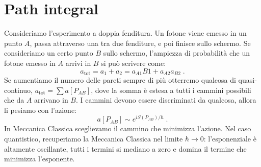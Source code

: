 \documentclass[12pt,a4paper]{article}
\theoremstyle{definition}
\numberwithin{equation}{section}
\begin{document}
\section{Path integral}
Consideriamo l'esperimento a doppia fenditura. Un fotone viene emesso in un punto $A$, passa attraverso una tra due fenditure, e poi finisce sullo schermo. Se consideriamo un certo punto $B$ sullo schermo, l'ampiezza di probabilità che un fotone emesso in $A$ arrivi in $B$ si può scrivere come:
$$
a_{\mathrm{tot}}=a_1+a_2=a_{A1}{B1}+a_{A2}a_{B2}\;.
$$
Se aumentiamo il numero delle pareti sempre di più otterremo qualcosa di quasi-continuo, $a_{\mathrm{tot}}=\sum a[P_{AB}]$, dove la somma è estesa a tutti i cammini possibili che da $A$ arrivano in $B$. I cammini devono essere discriminati da qualcosa, allora li pesiamo con l'azione:
$$
a[P_{AB}]\sim e^{iS(P_{AB})/\hbar}\;.
$$
In Meccanica Classica sceglievamo il cammino che minimizza l'azione. Nel caso quantistico, recuperiamo la Meccanica Classica nel limite $\hbar\to 0$: l'esponenziale è altamente oscillante, tutti i termini si mediano a zero e domina il termine che minimizza l'esponente.
\end{document}

